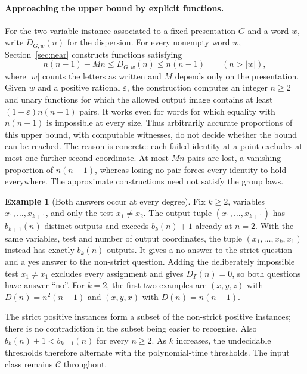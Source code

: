 \documentclass[12pt]{article}
\theoremstyle{definition}
\newtheorem{example}[theorem]{Example}
\begin{document}
\paragraph{Approaching the upper bound by explicit functions.}
For the two-variable instance associated to a fixed presentation $G$
and a word $w$, write $D_{G,w}(n)$ for the dispersion.
For every nonempty word $w$, Section~\ref{sec:near} constructs functions
satisfying
\[
 n(n-1)-Mn\le D_{G,w}(n)\le n(n-1)\qquad(n>|w|),
\]
where $|w|$ counts the letters as written and $M$ depends only on the
presentation. Given $w$ and a positive rational $\varepsilon$, the
construction computes an integer $n\ge2$ and unary functions for which
the allowed output image contains at least $(1-\varepsilon)n(n-1)$ pairs. It works even
for words for which equality with $n(n-1)$ is impossible at every size.
Thus arbitrarily accurate proportions of this upper bound, with
computable witnesses, do not decide whether the bound can be reached.
The reason is concrete: each failed identity at a point excludes at
most one further second coordinate. At most $Mn$ pairs are lost, a
vanishing proportion of $n(n-1)$, whereas losing no pair forces every
identity to hold everywhere. The approximate constructions need not
satisfy the group laws.

\begin{example}[Both answers occur at every degree]\label{ex:nonvacuity}
Fix $k\ge2$, variables $x_1,\ldots,x_{k+1}$, and only the test
$x_1\ne x_2$. The output tuple $(x_1,\ldots,x_{k+1})$ has
$b_{k+1}(n)$ distinct outputs and exceeds $b_k(n)+1$ already at $n=2$.
With the same variables, test and number of output coordinates, the
tuple $(x_1,\ldots,x_k,x_1)$ instead has exactly $b_k(n)$ outputs.
It gives a no answer to the strict question and a yes answer to the
non-strict question. Adding the deliberately impossible test $x_1\ne x_1$
excludes every assignment and gives $D_\Gamma(n)=0$, so both questions
have answer ``no''.
For $k=2$, the first two examples are $(x,y,z)$ with
$D(n)=n^2(n-1)$ and $(x,y,x)$ with $D(n)=n(n-1)$.
\end{example}

The strict positive instances form a subset of the non-strict positive
instances; there is no contradiction in the subset being easier to
recognise. Also $b_k(n)+1<b_{k+1}(n)$ for every $n\ge2$.
As $k$ increases, the undecidable thresholds therefore alternate with
the polynomial-time thresholds. The input class remains $\mathcal C$
throughout.
\end{document}
